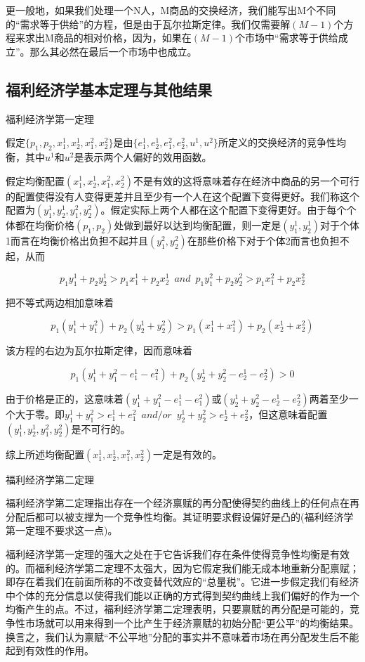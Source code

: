 \documentclass{article}
\begin{document}
更一般地，如果我们处理一个N人，M商品的交换经济，我们能写出M个不同的“需求等于供给”的方程，但是由于瓦尔拉斯定律。我们仅需要解$ (M-1) $个方程来求出M商品的相对价格，因为，如果在$ (M-1) $个市场中“需求等于供给成立”。那么其必然在最后一个市场中也成立。

\subsection{福利经济学基本定理与其他结果}

福利经济学第一定理

假定$ \{p_1,p_2,x^1_1,x^1_2,x^2_1,x^2_2\} $是由$ \{e^1_1,e^1_2,e^2_1,e^2_2,u^1,u^2\} $所定义的交换经济的竞争性均衡，其中$ u^1 $和$ u^2 $是表示两个人偏好的效用函数。

假定均衡配置$ (x^1_1,x^1_2,x^2_1,x^2_2) $不是有效的这将意味着存在经济中商品的另一个可行的配置使得没有人变得更差并且至少有一个人在这个配置下变得更好。我们称这个配置为$ (y^1_1,y^1_2,y^2_1,y^2_2) $。假定实际上两个人都在这个配置下变得更好。由于每个个体都在均衡价格$ (p_1,p_2) $处做到最好以达到均衡配置，则一定是$ (y^1_1,y^1_2) $对于个体1而言在均衡价格出负担不起并且$ (y^2_1,y^2_2) $在那些价格下对于个体2而言也负担不起，从而

\[
p_1y^1_1+p_2y^1_2>p_1x^1_1+p_2x^1_2\enspace and\enspace p_1y^2_1+p_2y^2_2>p_1x^2_1+p_2x^2_2
\]

把不等式两边相加意味着

\[
p_1(y^1_1+y^2_1)+p_2(y^1_2+y^2_2)>p_1(x^1_1+x^2_1)+p_2(x^1_2+x^2_2)
\]

该方程的右边为瓦尔拉斯定律，因而意味着

\[
p_1(y^1_1+y^2_1-e^1_1-e^2_1)+p_2(y^1_2+y^2_2-e^1_2-e^2_2)>0
\]

由于价格是正的，这意味着$ (y^1_1+y^2_1-e^1_1-e^2_1) $或$ (y^1_2+y^2_2-e^1_2-e^2_2) $两着至少一个大于零。即$ y^1_1+y^2_1>e^1_1+e^2_1\enspace and/or\enspace y^1_2+y^2_2>e^1_2+e^2_2 $，但这意味着配置$ (y^1_1,y^1_2,y^2_1,y^2_2) $是不可行的。

综上所述均衡配置$ (x^1_1,x^1_2,x^2_1,x^2_2) $一定是有效的。

\hspace*{\fill}

福利经济学第二定理

福利经济学第二定理指出存在一个经济禀赋的再分配使得契约曲线上的任何点在再分配后都可以被支撑为一个竞争性均衡。其证明要求假设偏好是凸的(福利经济学第一定理不要求这一点)。

福利经济学第一定理的强大之处在于它告诉我们存在条件使得竞争性均衡是有效的。而福利经济学第二定理不太强大，因为它假定我们能无成本地重新分配禀赋；即存在着我们在前面所称的不改变替代效应的“总量税”。它进一步假定我们有经济中个体的充分信息以使得我们能以正确的方式得到契约曲线上我们偏好的作为一个均衡产生的点。不过，福利经济学第二定理表明，只要禀赋的再分配是可能的，竞争性市场就可以用来得到一个比产生于经济禀赋的初始分配“更公平”的均衡结果。换言之，我们认为禀赋“不公平地”分配的事实并不意味着市场在再分配发生后不能起到有效性的作用。
\end{document}
